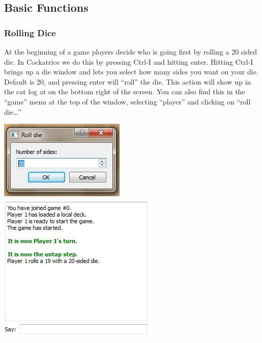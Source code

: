 \documentclass[a4paper]{scrbook}
\begin{document}
\subsection{Basic Functions}
\subsubsection{Rolling Dice}
At the beginning of a game players decide who is going first by rolling a 20 sided die. In Cockatrice we do this by pressing Ctrl-I and hitting enter. Hitting Ctrl-I brings up a die window and lets you select how many sides you want on your die. Default is 20, and pressing enter will “roll” the die. This action will show up in the cat log at on the bottom right of the screen. You can also find this in the “game” menu at the top of the window, selecting “player” and clicking on “roll die…”
\begin{center}
 \includegraphics{pics/fetch7486}\\
 \includegraphics{pics/fetch3705}
\end{center}
\end{document}
